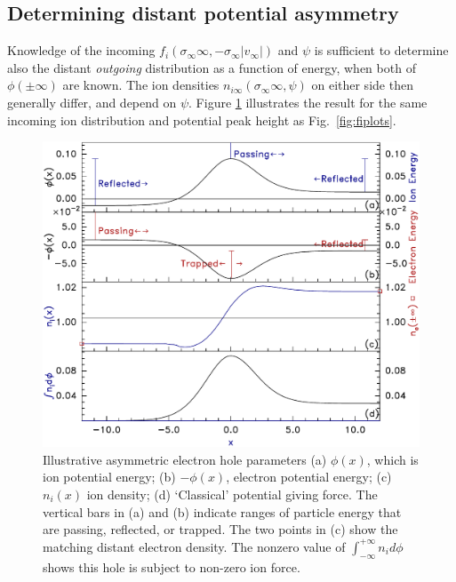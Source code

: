 \documentclass[pre]{revtex4-2}
\begin{document}
\subsection{Determining distant potential asymmetry}
\label{phisymmetry}
Knowledge of the incoming
$f_{i}(\sigma_\infty\infty,-\sigma_\infty|v_\infty|)$ and $\psi$ is
sufficient to determine also the distant \emph{outgoing} distribution
as a function of energy, when both of $\phi(\pm\infty)$ are known.
The ion densities $n_{i\infty}(\sigma_{\infty}\infty,\psi)$ on either
side then generally differ, and depend on $\psi$. Figure
\ref{fig:explot} illustrates the result for the same incoming ion
distribution and potential peak height as Fig.\ \ref{fig:fiplots}.
\begin{figure}[htp]
  \centering
  \includegraphics[width=0.6\hsize]{explot}
  \caption{Illustrative asymmetric electron hole parameters (a)
    $\phi(x)$, which is ion potential energy; (b)
    $-\phi(x)$, electron potential energy; (c)
    $n_i(x)$ ion density; (d) `Classical' potential giving force.
  The vertical bars in (a) and (b) indicate ranges of particle energy
  that are passing, reflected, or trapped. The two points in (c) show
  the matching distant electron density. The nonzero value of
  $\int_{-\infty}^{+\infty} n_id\phi$ shows this hole is subject to
  non-zero ion force.}
  \label{fig:explot}
\end{figure}
\end{document}
